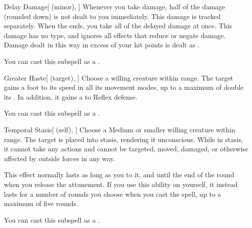 \begin{ability}[\nth{3}]{Delay Damage}[ (minor), ]
Whenever you take damage, half of the damage (rounded down) is not dealt to you immediately.
This damage is tracked separately.
When the ends, you take all of the delayed damage at once.
This damage has no type, and ignores all effects that reduce or negate damage.
Damage dealt in this way in excess of your hit points is dealt as .

You can cast this subspell as a .
\end{ability}
\vspace{0.25em}


\begin{ability}[\nth{3}]{Greater Haste}[ (target), ]
Choose a willing creature within \rngmed range.
The target gains a  foot  to its speed in all its movement modes, up to a maximum of double its .
In addition, it gains a   to Reflex defense.

You can cast this subspell as a .
\end{ability}
\vspace{0.25em}


\begin{ability}[\nth{3}]{Temporal Stasis}[ (self), ]
Choose a Medium or smaller willing creature within \rngmed range.
The target is placed into stasis, rendering it unconscious.
While in stasis, it cannot take any actions and cannot be targeted, moved, damaged, or otherwise affected by outside forces in any way.

This effect normally lasts as long as you  to it, and until the end of the round when you release the attunement.
If you use this ability on yourself, it instead lasts for a number of rounds you choose when you cast the spell, up to a maximum of five rounds.

You can cast this subspell as a .
\end{ability}
\vspace{0.25em}



